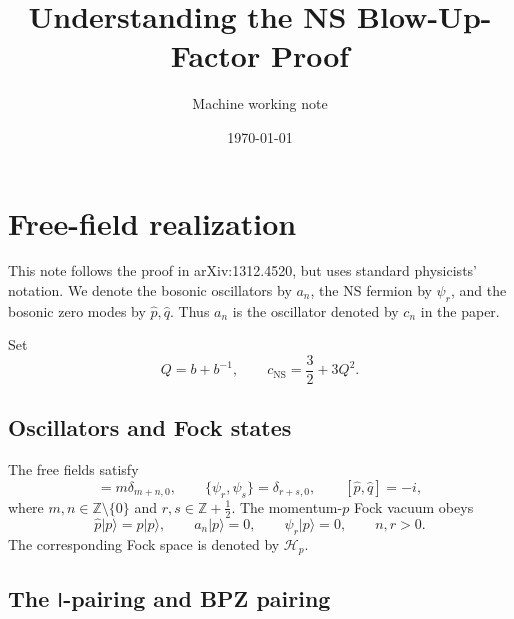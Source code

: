 \documentclass[11pt]{article}
\title{Understanding the NS Blow-Up-Factor Proof}
\author{Machine working note}
\date{\today}
\newcommand{\cH}{\mathcal H}
\begin{document}
\maketitle

\section{Free-field realization}

This note follows the proof in arXiv:1312.4520, but uses standard
physicists' notation.  We denote the bosonic oscillators by \(a_n\), the NS
fermion by \(\psi_r\), and the bosonic zero modes by
\(\widehat p,\widehat q\).  Thus \(a_n\) is the oscillator denoted by
\(c_n\) in the paper.

Set
\begin{equation}
 Q=b+b^{-1},
 \qquad
 c_{\mathrm{NS}}=\frac32+3Q^2.
 \label{eq:Q-and-central-charge}
\end{equation}

\subsection{Oscillators and Fock states}

The free fields satisfy
\begin{equation}
 [a_m,a_n]=m\delta_{m+n,0},
 \qquad
 \{\psi_r,\psi_s\}=\delta_{r+s,0},
 \qquad
 [\widehat p,\widehat q]=-i,
 \label{eq:free-field-algebra}
\end{equation}
where \(m,n\in\mathbb Z\setminus\{0\}\) and
\(r,s\in\mathbb Z+\frac12\).  The momentum-\(p\) Fock vacuum obeys
\begin{equation}
 \widehat p\lvert p\rangle=p\lvert p\rangle,
 \qquad
 a_n\lvert p\rangle=0,
 \qquad
 \psi_r\lvert p\rangle=0,
 \qquad n,r>0.
 \label{eq:Fock-vacuum}
\end{equation}
The corresponding Fock space is denoted by \(\cH_p\).

\subsection{The \texorpdfstring{\(\mathsf I\)}{I}-pairing and BPZ pairing}
\end{document}
